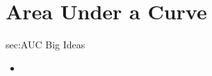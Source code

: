 \chapter{Area Under a Curve}
\label{chap:AUC}

\begin{bigideas}{sec:AUC Big Ideas}
\begin{itemize}
  \item 
\end{itemize}
\end{bigideas}
